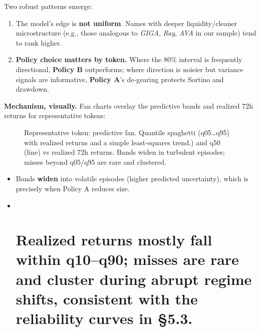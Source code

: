 \documentclass[
  a4paper,
  DIV=11,
  numbers=noendperiod]{scrreprt}
\providecommand{\tightlist}{%
  \setlength{\itemsep}{0pt}\setlength{\parskip}{0pt}}
\begin{document}
Two robust patterns emerge:

\begin{enumerate}
\def\labelenumi{\arabic{enumi}.}
\tightlist
\item
  The model's edge is \textbf{not uniform}. Names with deeper
  liquidity/cleaner microstructure (e.g., those analogous to
  \emph{GIGA}, \emph{Ray}, \emph{AVA} in our sample) tend to rank
  higher.
\item
  \textbf{Policy choice matters by token.} Where the 80\% interval is
  frequently directional, \textbf{Policy B} outperforms; where direction
  is noisier but variance signals are informative, \textbf{Policy A}'s
  de-gearing protects Sortino and drawdown.
\end{enumerate}

\textbf{Mechanism, visually.} Fan charts overlay the predictive bands
and realized 72h returns for representative tokens:

\begin{figure}


\caption{\label{fig-token-fan}Representative token: predictive fan.
Quantile spaghetti (q05\ldots q95) with realized returns and a simple
least-squares trend.) and q50 (line) vs realized 72h returns. Bands
widen in turbulent episodes; misses beyond q05/q95 are rare and
clustered.}

\end{figure}%

\begin{itemize}
\item
  Bands \textbf{widen} into volatile episodes (higher predicted
  uncertainty), which is precisely when Policy A reduces size.
\item ~
  \section{\texorpdfstring{Realized returns mostly fall within
  \textbf{q10--q90}; misses are rare and cluster during abrupt regime
  shifts, consistent with the reliability curves in
  §5.3.}{Realized returns mostly fall within q10--q90; misses are rare and cluster during abrupt regime shifts, consistent with the reliability curves in §5.3.}}\label{realized-returns-mostly-fall-within-q10q90-misses-are-rare-and-cluster-during-abrupt-regime-shifts-consistent-with-the-reliability-curves-in-5.3.}
\end{itemize}
\end{document}
